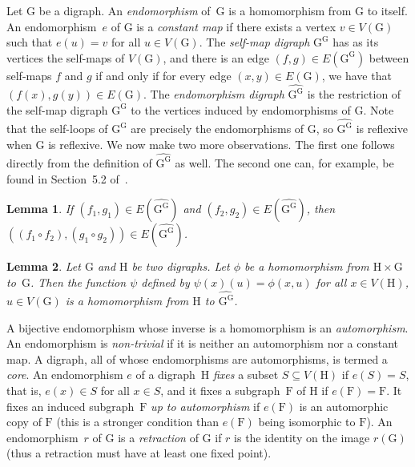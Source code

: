 \documentclass[a4paper,12pt]{article}
\newtheorem{lemma}{Lemma}
\theoremstyle{remark}
\newcommand{\G}{\ensuremath{\mathrm{G}}}
\newcommand{\F}{\ensuremath{\mathrm{F}}}
\renewcommand{\H}{\ensuremath{\mathrm{H}}}
\begin{document}
 Let $\G$ be a digraph. An \emph{endomorphism} of~$\G$ is a homomorphism from $\G$ to itself. 
 An endomorphism~$e$ of $\G$ is a \emph{constant map} if there exists a vertex $v\in V(\G)$ such that $e(u)=v$ for all $u\in V(\G)$.
The \emph{self-map digraph} $\G^{\G}$ has as its vertices the self-maps of $V(\G)$, and there is an edge $(f,g) \in E(\G^\G)$ between self-maps $f$ and $g$ if and only if for every edge $(x,y) \in E(\G)$, we have that $(f(x),g(y)) \in E(\G)$. The \emph{endomorphism digraph} $\widehat{\G^{\G}}$ is the restriction of the self-map digraph $\G^{\G}$ to the vertices induced by endomorphisms of $\G$. Note that the self-loops of $\G^{\G}$ are precisely the endomorphisms of $\G$, so $\widehat{\G^{\G}}$ is reflexive when $\G$ is reflexive. We now make two more observations. 
The first one follows directly from the definition of $\widehat{\G^{\G}}$ as well. 
The second one can, for example, be found in Section~5.2 of~\cite{llt}.

\begin{lemma}\label{l-gg2}
If $(f_1,g_1) \in E(\widehat{\G^\G})$ and $(f_2,g_2) \in E(\widehat{\G^\G})$, then $((f_1 \circ f_2),(g_1 \circ g_2)) \in E(\widehat{\G^\G})$. 
\end{lemma}

\begin{lemma}\label{l-gg3}
Let $\G$ and $\H$ be two digraphs. Let $\phi$ be a homomorphism from $\H\times \G$ to~$\G$.
Then the function $\psi$ defined by $\psi(x)(u)=\phi(x,u)$ for all $x\in V(\H)$, $u\in V(\G)$ 
is a homomorphism from $\H$ to $\widehat{\G^{\G}}$.
\end{lemma} 
 
A bijective endomorphism whose inverse is a homomorphism is an \emph{automorphism}.
An endomorphism is \emph{non-trivial} if it is neither an automorphism nor a constant map.
 A digraph, all of whose endomorphisms are automorphisms, is termed a \emph{core}. 
An endomorphism $e$ of a digraph~$\H$ \emph{fixes} a subset $S \subseteq V(\H)$ if $e(S)=S$, that is, $e(x)\in S$ for all $x \in S$, 
and it fixes a subgraph~$\F$ of $\H$ if $e(\F)=\F$. It fixes an induced subgraph~$\F$ \emph{up to automorphism} if $e(\F)$ is an automorphic copy of $\F$ (this is a stronger condition than $e(\F)$ being isomorphic to $\F$). 
An endomorphism~$r$ of $\G$ is a \emph{retraction} of $\G$ if $r$ is the identity on the image $r(\G)$ (thus a retraction must have at least one fixed point).
\end{document}
